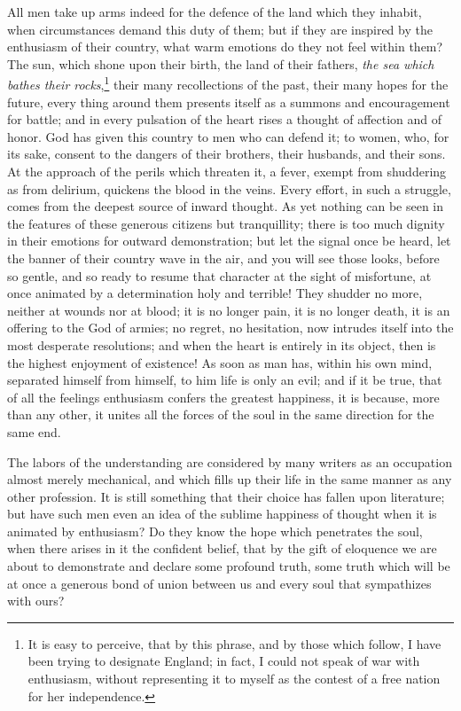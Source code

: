All men take up arms indeed for the defence of the land which they
inhabit, when circumstances demand this duty of them; but if they are
inspired by the enthusiasm of their country, what warm emotions do
they not feel within them? The sun, which shone upon their birth, the
land of their fathers, \textit{the sea which bathes their
rocks},\footnote{It is easy to perceive, that by this phrase, and by
those which follow, I have been trying to designate England; in fact,
I could not speak of war with enthusiasm, without representing it to
myself as the contest of a free nation for her independence.} their
many recollections of the past, their many hopes for the future, every
thing around  them presents itself as a summons and
encouragement for battle; and in every pulsation of the heart rises a
thought of affection and of honor. God has given this country to men
who can defend it; to women, who, for its sake, consent to the
dangers of their brothers, their husbands, and their sons. At the
approach of the perils which threaten it, a fever, exempt from
shuddering as from delirium, quickens the blood in the veins. Every
effort, in such a struggle, comes from the deepest source of inward
thought. As yet nothing can be seen in the features of these generous
citizens but tranquillity; there is too much dignity in their emotions
for outward demonstration; but let the signal once be heard, let the
banner of their country wave in the air, and you will see those looks,
before so gentle, and so ready to resume that character at the sight
of misfortune, at once animated by a determination holy and terrible!
They shudder no more, neither at wounds nor at blood; it is no longer
pain, it is no longer death, it is an offering to the God of armies;
no regret, no hesitation, now intrudes itself into the most
desperate resolutions; and when the heart is entirely in its object,
then is the highest enjoyment of existence! As soon as man has, within
his own mind, separated himself from himself, to him life is only an
evil; and if it be true, that of all the feelings enthusiasm confers
the greatest happiness, it is because, more than any other, it unites
all the forces of the soul in the same direction for the same end.

The labors of the understanding are considered by many writers as an
occupation almost merely mechanical, and which fills up their life in
the same manner as any other profession. It is still something that
their choice has fallen upon literature; but have such men even an
idea of the sublime happiness of thought when it is animated by
enthusiasm? Do they know the hope which penetrates the soul, when
there arises in it the confident belief, that by the gift of eloquence
we are about to demonstrate and declare some profound truth, some
truth which will be at once a generous bond of union between us and
every soul that sympathizes with ours?

